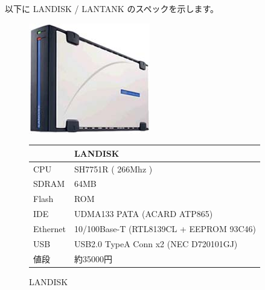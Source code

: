 \documentclass[mingoth,a4paper]{jsarticle}
\begin{document}
以下に LANDISK / LANTANK のスペックを示します。
\begin{figure}[htbp]
 \begin{minipage}{0.5\hsize}
  \includegraphics[width=0.6\hsize]{image200705/landisk00.jpg}
  \caption{LANDISK}
 \end{minipage}
 \begin{minipage}{0.5\hsize}
  \begin{tabular}{|l|l|} \hline
   & LANDISK \\ \hline
   CPU & SH7751R ( 266Mhz ) \\ \hline
   SDRAM & 64MB\\ \hline
   Flash & ROM \\ \hline
   IDE & UDMA133 PATA (ACARD ATP865)\\ \hline
   Ethernet & 10/100Base-T (RTL8139CL + EEPROM 93C46) \\ \hline
   USB & USB2.0 TypeA Conn x2 (NEC D720101GJ) \\ \hline
   値段 & 約35000円 \\ \hline 
 \end{tabular}
 \end{minipage}
\end{figure}
\end{document}
